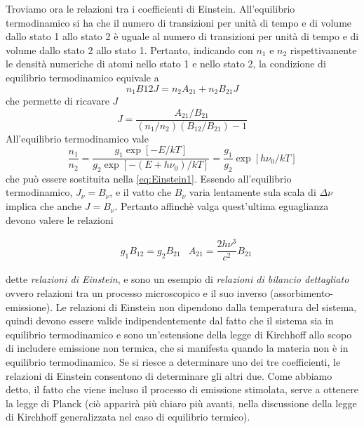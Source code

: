 Troviamo ora le relazioni tra i coefficienti di Einstein. All'equilibrio termodinamico si ha che il numero di transizioni per unità di tempo e di volume dallo stato 1 allo stato 2 è uguale al numero di transizioni per unità di tempo e di volume dallo stato 2 allo stato 1. Pertanto, indicando con $n_1$ e $n_2$ rispettivamente le densità numeriche di atomi nello stato 1 e nello stato 2, la condizione di equilibrio termodinamico equivale a
\begin{equation}
n_1 B{12}J = n_2 A_{21} + n_2 B_{21} J \label{eq:Einstein2}
\end{equation}
che permette di ricavare $J$
\begin{equation}
J = \dfrac{A_{21}/B_{21}}{(n_1/n_2)(B_{12}/B_{21})-1} \label{eq:Einstein1}
\end{equation}
All'equilibrio termodinamico vale 
\begin{equation}
\dfrac{n_1}{n_2}=\dfrac{g_1 \exp[-E/kT]}{g_2 \exp[-(E+h\nu_0)/kT]} = \dfrac{g_1}{g_2}\exp[h\nu_0/kT]
\end{equation}
che può essere sostituita nella \ref{eq:Einstein1}. Essendo all'equilibrio termodinamico, $J_\nu=B_\nu$, e il vatto che $B_\nu$ varia lentamente sula scala di $\Delta\nu$ implica che anche $J=B_\nu$. Pertanto affinchè valga quest'ultima eguaglianza devono valere le relazioni
\begin{EQ}
\begin{align}
&g_1 B_{12} = g_2 B_{21}
&A_21 = \dfrac{2h\nu^3}{c^2} B_{21}
\end{align}
\end{EQ}
dette \textit{relazioni di Einstein}, e sono un esempio di \textit{relazioni di bilancio dettagliato} ovvero relazioni tra un processo microscopico e il suo inverso (assorbimento-emissione). Le relazioni di Einstein non dipendono dalla temperatura del sistema, quindi devono essere valide indipendentemente dal fatto che il sistema sia in equilibrio termodinamico e sono un'estensione della legge di Kirchhoff allo scopo di includere emissione non termica, che si manifesta quando la materia non è in equilibrio termodinamico. Se si riesce a determinare uno dei tre coefficienti, le relazioni di Einstein consentono di determinare gli altri due. Come abbiamo detto, il fatto che viene incluso il processo di emissione stimolata, serve a ottenere la legge di Planck (ciò apparirà più chiaro più avanti, nella discussione della legge di Kirchhoff generalizzata nel caso di equilibrio termico).

